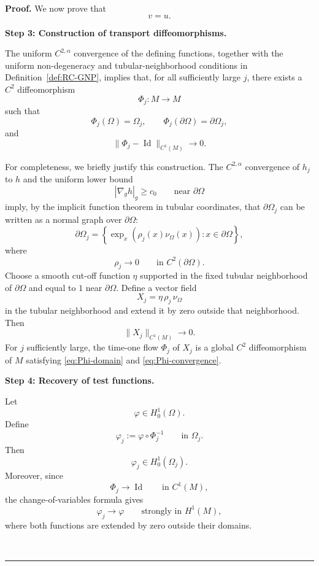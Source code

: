 \documentclass{article}
\newenvironment{proof}[1][Proof]{\textbf{#1.} }{\ \rule{0.5em}{0.5em}}
\begin{document}
\begin{proof}
We now prove that
\[
v=u.
\]

\medskip
\noindent
\textbf{Step 3: Construction of transport diffeomorphisms.}

The uniform $C^{2,\alpha}$ convergence of the defining functions,
together with the uniform non-degeneracy and tubular-neighborhood
conditions in Definition~\ref{def:RC-GNP}, implies that, for all
sufficiently large $j$, there exists a $C^2$ diffeomorphism
\[
\Phi_j:M\longrightarrow M
\]
such that
\begin{equation}
\Phi_j(\Omega)=\Omega_j,
\qquad
\Phi_j(\partial\Omega)=\partial\Omega_j,
\label{eq:Phi-domain}
\end{equation}
and
\begin{equation}
\|\Phi_j-\operatorname{Id}\|_{C^1(M)}
\longrightarrow0.
\label{eq:Phi-convergence}
\end{equation}

For completeness, we briefly justify this construction. The
$C^{2,\alpha}$ convergence of $h_j$ to $h$ and the uniform lower bound
\[
|\nabla_g h|_g\ge c_0
\qquad\text{near }\partial\Omega
\]
imply, by the implicit function theorem in tubular coordinates, that
$\partial\Omega_j$ can be written as a normal graph over
$\partial\Omega$:
\[
\partial\Omega_j
=
\left\{
\exp_x(\rho_j(x)\nu_\Omega(x)):
x\in\partial\Omega
\right\},
\]
where
\[
\rho_j\longrightarrow0
\qquad\text{in }C^2(\partial\Omega).
\]
Choose a smooth cut-off function $\eta$ supported in the fixed tubular
neighborhood of $\partial\Omega$ and equal to $1$ near
$\partial\Omega$. Define a vector field
\[
X_j
=
\eta\,\rho_j\,\nu_\Omega
\]
in the tubular neighborhood and extend it by zero outside that
neighborhood. Then
\[
\|X_j\|_{C^1(M)}\longrightarrow0.
\]
For $j$ sufficiently large, the time-one flow $\Phi_j$ of $X_j$ is a
global $C^2$ diffeomorphism of $M$ satisfying
\eqref{eq:Phi-domain} and \eqref{eq:Phi-convergence}.

\medskip
\noindent
\textbf{Step 4: Recovery of test functions.}

Let
\[
\varphi\in H_0^1(\Omega).
\]
Define
\[
\varphi_j
:=
\varphi\circ\Phi_j^{-1}
\qquad\text{in }\Omega_j.
\]
Then
\[
\varphi_j\in H_0^1(\Omega_j).
\]
Moreover, since
\[
\Phi_j\to\operatorname{Id}
\qquad\text{in }C^1(M),
\]
the change-of-variables formula gives
\begin{equation}
\varphi_j\longrightarrow\varphi
\qquad\text{strongly in }H^1(M),
\label{eq:test-function-convergence}
\end{equation}
where both functions are extended by zero outside their domains.


\end{proof}
\end{document}

